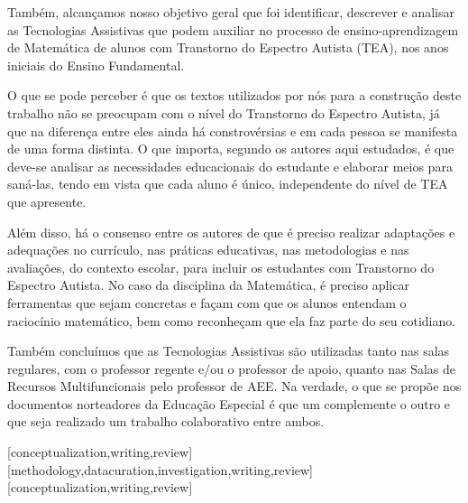 \documentclass[portuguese]{textolivre}
\begin{document}
Também, alcançamos nosso objetivo geral que foi identificar, descrever e
analisar as Tecnologias Assistivas que podem auxiliar no processo de
ensino-aprendizagem de Matemática de alunos com Transtorno do Espectro
Autista (TEA), nos anos iniciais do Ensino Fundamental.

O que se pode perceber é que os textos utilizados por nós para a
construção deste trabalho não se preocupam com o nível do Transtorno do
Espectro Autista, já que na diferença entre eles ainda há constrovérsias
e em cada pessoa se manifesta de uma forma distinta. O que importa,
segundo os autores aqui estudados, é que deve-se analisar as
necessidades educacionais do estudante e elaborar meios para saná-las,
tendo em vista que cada aluno é único, independente do nível de TEA que
apresente.

Além disso, há o consenso entre os autores de que é preciso realizar
adaptações e adequações no currículo, nas práticas educativas, nas
metodologias e nas avaliações, do contexto escolar, para incluir os
estudantes com Transtorno do Espectro Autista. No caso da disciplina da
Matemática, é preciso aplicar ferramentas que sejam concretas e façam
com que os alunos entendam o raciocínio matemático, bem como reconheçam
que ela faz parte do seu cotidiano.

Também concluímos que as Tecnologias Assistivas são utilizadas tanto nas
salas regulares, com o professor regente e/ou o professor de apoio,
quanto nas Salas de Recursos Multifuncionais pelo professor de AEE. Na
verdade, o que se propõe nos documentos norteadores da Educação Especial
é que um complemente o outro e que seja realizado um trabalho
colaborativo entre ambos.



\printbibliography\label{sec-bib}
\begin{contributors}
[conceptualization,writing,review]
[methodology,datacuration,investigation,writing,review]
[conceptualization,writing,review]
\end{contributors}
\end{document}
